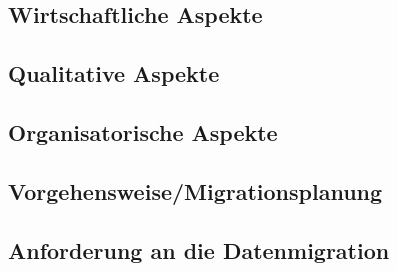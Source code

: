 \subsection{Wirtschaftliche Aspekte}
\subsection{Qualitative Aspekte}
\subsection{Organisatorische Aspekte}
\subsection{Vorgehensweise/Migrationsplanung}
\subsection{Anforderung an die Datenmigration}



